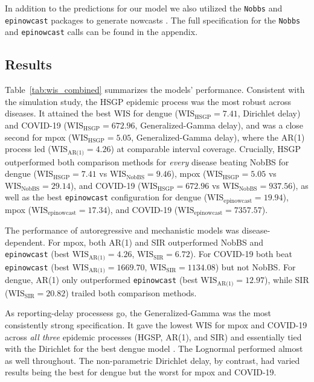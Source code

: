 \documentclass[12pt]{article}
\begin{document}
In addition to the predictions for our model we also utilized the \texttt{Nobbs}  and \texttt{epinowcast} packages to generate nowcasts \cite{epinowcast, nobbs}. The full specification for the \texttt{Nobbs} and \texttt{epinowcast} calls can be found in the appendix. 

\subsection{Results}

Table~\ref{tab:wis_combined} summarizes the models' performance. Consistent with the simulation study, the HSGP epidemic process was the most robust across diseases. It attained the best WIS for dengue
($\text{WIS}_{\text{HSGP}} = 7.41$, Dirichlet delay) and COVID-19
($\text{WIS}_{\text{HSGP}} = 672.96$, Generalized-Gamma delay), and was a close second for mpox ($\text{WIS}_{\text{HSGP}} = 5.05$, Generalized-Gamma delay), where the AR(1) process led ($\text{WIS}_{\text{AR(1)}} = 4.26$) at comparable interval coverage. Crucially, HSGP outperformed both comparison methods for \emph{every} disease beating NobBS for dengue ($\text{WIS}_{\text{HSGP}} = 7.41$ vs $\text{WIS}_{\text{NobBS}} = 9.46$), mpox ($\text{WIS}_{\text{HSGP}} = 5.05$ vs $\text{WIS}_{\text{NobBS}} =29.14$), and COVID-19 ($\text{WIS}_{\text{HSGP}} = 672.96$ vs $\text{WIS}_{\text{NobBS}} = 937.56$), as well as the best \texttt{epinowcast} configuration for dengue ($\text{WIS}_{\text{epinowcast}}=19.94$), mpox ($\text{WIS}_{\text{epinowcast}}=17.34$), and COVID-19 ($\text{WIS}_{\text{epinowcast}} = 7357.57$).

The performance of autoregressive and mechanistic models was disease-dependent. For mpox, both AR(1) and SIR  outperformed NobBS and \texttt{epinowcast} (best $\text{WIS}_{\text{AR(1)}} = 4.26$, $\text{WIS}_{\text{SIR}} = 6.72$). For COVID-19 both beat  \texttt{epinowcast} (best $\text{WIS}_{\text{AR(1)}} = 1669.70$, $\text{WIS}_{\text{SIR}} = 1134.08$) but not NobBS. For dengue, AR(1) only outperformed \texttt{epinowcast} (best $\text{WIS}_{\text{AR(1)}} = 12.97$), while SIR ($\text{WIS}_{\text{SIR}} = 20.82$) trailed both comparison methods.

As reporting-delay processess go, the Generalized-Gamma was the most consistently strong specification. It gave the lowest WIS for mpox and COVID-19 across \emph{all three} epidemic processes (HGSP, AR(1), and SIR) and essentially tied with the Dirichlet for the best dengue model . The Lognormal performed almost as well throughout. The non-parametric Dirichlet delay, by contrast, had varied results being the best for dengue but the worst for mpox and COVID-19. 
\end{document}
